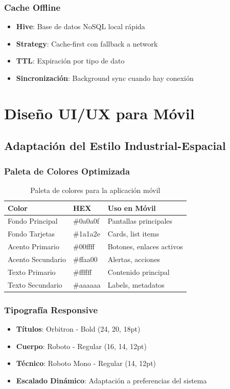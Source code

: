 \documentclass[12pt]{article}
\begin{document}
\subsubsection{Cache Offline}
\begin{itemize}
    \item \textbf{Hive}: Base de datos NoSQL local rápida
    \item \textbf{Strategy}: Cache-first con fallback a network
    \item \textbf{TTL}: Expiración por tipo de dato
    \item \textbf{Sincronización}: Background sync cuando hay conexión
\end{itemize}

\section{Diseño UI/UX para Móvil}
\label{sec:diseno}

\subsection{Adaptación del Estilo Industrial-Espacial}

\subsubsection{Paleta de Colores Optimizada}
\begin{table}[H]
\centering
\begin{tabularx}{\textwidth}{|l|l|X|}
\hline
\textbf{Color} & \textbf{HEX} & \textbf{Uso en Móvil} \\
\hline
Fondo Principal & \#0a0a0f & Pantallas principales \\
\hline
Fondo Tarjetas & \#1a1a2e & Cards, list items \\
\hline
Acento Primario & \#00ffff & Botones, enlaces activos \\
\hline
Acento Secundario & \#ffaa00 & Alertas, acciones \\
\hline
Texto Primario & \#ffffff & Contenido principal \\
\hline
Texto Secundario & \#aaaaaa & Labels, metadatos \\
\hline
\end{tabularx}
\caption{Paleta de colores para la aplicación móvil}
\end{table}

\subsubsection{Tipografía Responsive}
\begin{itemize}
    \item \textbf{Títulos}: Orbitron - Bold (24, 20, 18pt)
    \item \textbf{Cuerpo}: Roboto - Regular (16, 14, 12pt)
    \item \textbf{Técnico}: Roboto Mono - Regular (14, 12pt)
    \item \textbf{Escalado Dinámico}: Adaptación a preferencias del sistema
\end{itemize}
\end{document}
